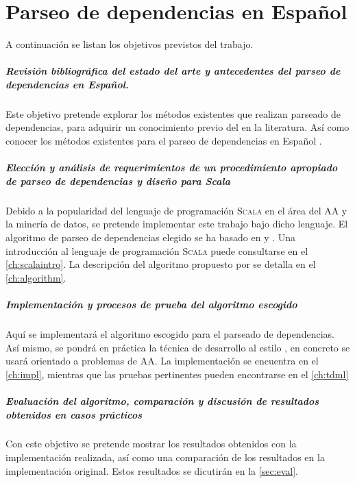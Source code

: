 \chapter{Parseo de dependencias en Español}\label{ch:goals}

A continuación se listan los objetivos previstos del trabajo.

\paragraph{Revisión bibliográfica del estado del arte y antecedentes del parseo
  de dependencias en Español.} Este objetivo pretende explorar los métodos
existentes que realizan parseado de dependencias, para adquirir un conocimiento
previo del  en la literatura. Así como conocer los
métodos existentes para el parseo de dependencias en Español
\cite{ballesteros2016}.

\paragraph{Elección y análisis de requerimientos de un procedimiento apropiado de
  parseo de dependencias y diseño para Scala}
Debido a la popularidad del lenguaje de programación \textsc{Scala} en el área
del \ac{AA} y la minería de datos, se pretende implementar este trabajo bajo
dicho lenguaje. El algoritmo de parseo de dependencias elegido se ha basado en
\citeauthor{yamada2003} \cite{yamada2003} y \citeauthor{rohit2016}
\cite{rohit2016}. Una introducción al lenguaje de programación \textsc{Scala}
puede consultarse en el \autoref{ch:scalaintro}. La descripción del algoritmo
propuesto por \citeauthor{yamada2003} se detalla en el \autoref{ch:algorithm}.

\paragraph{Implementación y procesos de prueba del algoritmo escogido}
Aquí se implementará el algoritmo escogido para el parseado de dependencias. Así
mismo, se pondrá en práctica la técnica de desarrollo al estilo
, en concreto se usará  orientado a
problemas de \ac{AA}. La implementación se encuentra en el \autoref{ch:impl},
mientras que las pruebas pertinentes pueden encontrarse en el \autoref{ch:tdml}

\paragraph{Evaluación del algoritmo, comparación y discusión de resultados
  obtenidos en casos prácticos}
Con este objetivo se pretende mostrar los resultados obtenidos con la
implementación realizada, así como una comparación de los resultados
en la implementación original. Estos resultados se dicutirán en la
\autoref{sec:eval}.

